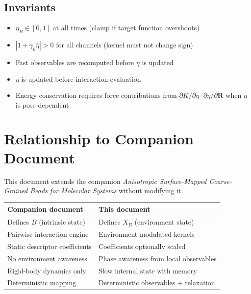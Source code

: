 \documentclass[11pt]{article}
\begin{document}
\subsection{Invariants}

\begin{itemize}
    \item $\eta_B \in [0, 1]$ at all times (clamp if target function
          overshoots)
    \item $|1 + \gamma_k \bar{\eta}| > 0$ for all channels (kernel must
          not change sign)
    \item Fast observables are recomputed before $\eta$ is updated
    \item $\eta$ is updated before interaction evaluation
    \item Energy conservation requires force contributions from
          $\partial K / \partial \eta \cdot \partial \eta / \partial \mathbf{R}$
          when $\eta$ is pose-dependent
\end{itemize}

\section{Relationship to Companion Document}

This document extends the companion
\emph{Anisotropic Surface-Mapped Coarse-Grained Beads for Molecular
Systems} without modifying it.

\begin{center}
\begin{tabular}{ll}
    \textbf{Companion document} & \textbf{This document} \\
    \hline
    Defines $B$ (intrinsic state) & Defines $X_B$ (environment state) \\
    Pairwise interaction engine & Environment-modulated kernels \\
    Static descriptor coefficients & Coefficients optionally scaled \\
    No environment awareness & Phase awareness from local observables \\
    Rigid-body dynamics only & Slow internal state with memory \\
    Deterministic mapping & Deterministic observables + relaxation \\
\end{tabular}
\end{center}
\end{document}
